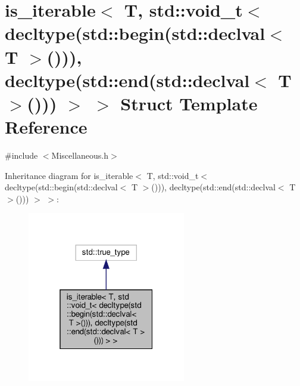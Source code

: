 \hypertarget{structis__iterable_3_01_t_00_01std_1_1void__t_3_01decltype_07std_1_1begin_07std_1_1declval_3_01_6e9fb167ef7cf6be085c68f3355f458c}{}\section{is\+\_\+iterable$<$ T, std\+:\+:void\+\_\+t$<$ decltype(std\+:\+:begin(std\+:\+:declval$<$ T $>$())), decltype(std\+:\+:end(std\+:\+:declval$<$ T $>$())) $>$ $>$ Struct Template Reference}
\label{structis__iterable_3_01_t_00_01std_1_1void__t_3_01decltype_07std_1_1begin_07std_1_1declval_3_01_6e9fb167ef7cf6be085c68f3355f458c}


{\ttfamily \#include $<$Miscellaneous.\+h$>$}



Inheritance diagram for is\+\_\+iterable$<$ T, std\+:\+:void\+\_\+t$<$ decltype(std\+:\+:begin(std\+:\+:declval$<$ T $>$())), decltype(std\+:\+:end(std\+:\+:declval$<$ T $>$())) $>$ $>$\+:\nopagebreak
\begin{figure}[H]
\begin{center}
\leavevmode
\includegraphics[width=196pt]{structis__iterable_3_01_t_00_01std_1_1void__t_3_01decltype_07std_1_1begin_07std_1_1declval_3_01_b7a4ab461bf675bfc11c691a48b8d31c}
\end{center}
\end{figure}


